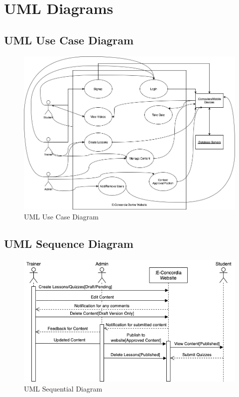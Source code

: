 \documentclass{report}
\begin{document}
\clearpage
\section{UML Diagrams}
\subsection{UML Use Case Diagram}
\begin{figure}[htb!]
    \centering
    \includegraphics[scale=0.3]{UCM.png}
    \caption{UML Use Case Diagram}
    \label{fig:my_label}
\end{figure}

\subsection{UML Sequence Diagram}
\begin{figure}[htb!]
    \centering
    \includegraphics[scale=0.6]{SD.png}
    \caption{UML Sequential Diagram}
    \label{fig:my_label}
\end{figure}
\end{document}
